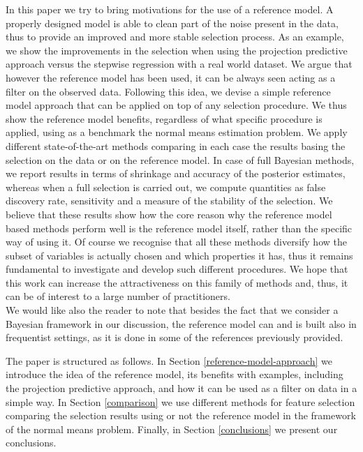 \documentclass[american,]{article}
\theoremstyle{definition}
\begin{document}
In this paper we try to bring motivations for the use of a reference model. A properly designed model is able to clean part of the noise present in the data, thus to provide an improved and more stable selection process. As an example, we show the improvements in the selection when using the projection predictive approach versus the stepwise regression with a real world dataset. We argue that however the reference model has been used, it can be always seen acting as a filter on the observed data. Following this idea, we devise a simple reference model approach that can be applied on top of any selection procedure. We thus show the reference model benefits, regardless of what specific procedure is applied, using as a benchmark the normal means estimation problem. We apply different state-of-the-art methods comparing in each case the results basing the selection on the data or on the reference model. In case of full Bayesian methods, we report results in terms of shrinkage and accuracy of the posterior estimates, whereas when a full selection is carried out, we compute quantities as false discovery rate, sensitivity and a measure of the stability of the selection. We believe that these results show how the core reason why the reference model based methods perform well is the reference model itself, rather than the specific way of using it. Of course we recognise that all these methods diversify how the subset of variables is actually chosen and which properties it has, thus it remains fundamental to investigate and develop such different procedures. We hope that this work can increase the attractiveness on this family of methods and, thus, it can be of interest to a large number of practitioners.
\\
We would like also the reader to note that besides the fact that we consider a Bayesian framework in our discussion, the reference model can and is built also in frequentist settings, as it is done in some of the references previously provided.

The paper is structured as follows. In Section \ref{reference-model-approach} we introduce the idea of the reference model, its benefits with examples, including the projection predictive approach, and how it can be used as a filter on data in a simple way. In Section \ref{comparison} we use different methods for feature selection comparing the selection results using or not the reference model in the framework of the normal means problem. Finally, in Section \ref{conclusions} we present our conclusions.
\end{document}
